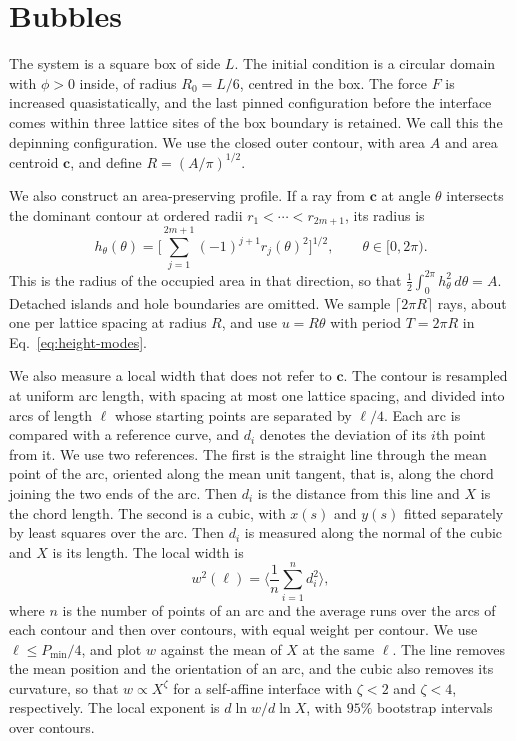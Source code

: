 \section{Bubbles}
\label{sec:bubbles}

The system is a square box of side $L$. The initial condition is a
circular domain with $\phi>0$ inside, of radius $R_0=L/6$, centred in
the box. The force $F$ is increased quasistatically, and the last pinned
configuration before the interface comes within three lattice sites of
the box boundary is retained. We call this the depinning configuration.
We use the closed outer contour, with area $A$ and area centroid
$\boldsymbol c$, and define $R=(A/\pi)^{1/2}$.

We also construct an area-preserving profile.
If a ray from $\boldsymbol c$ at angle $\theta$ intersects the dominant
contour at ordered radii $r_1<\cdots<r_{2m+1}$, its radius is
\begin{equation}
 h_\theta(\theta)=\Big[\sum_{j=1}^{2m+1}(-1)^{j+1}r_j(\theta)^2\Big]^{1/2},
 \qquad \theta\in[0,2\pi).
 \label{eq:area-radius}
\end{equation}
This is the radius of the occupied area in that direction, so that
$\frac12\int_0^{2\pi}h_\theta^2\,d\theta=A$.
Detached islands and hole boundaries are omitted.
We sample $\lceil2\pi R\rceil$ rays, about one per lattice spacing at
radius $R$, and use $u=R\theta$ with period $T=2\pi R$ in
Eq.~\eqref{eq:height-modes}.

We also measure a local width that does not refer to $\boldsymbol c$.
The contour is resampled at uniform arc length, with spacing at most one
lattice spacing, and divided into arcs of length $\ell$ whose starting
points are separated by $\ell/4$.
Each arc is compared with a reference curve, and $d_i$ denotes the
deviation of its $i$th point from it.
We use two references.
The first is the straight line through the mean point of the arc,
oriented along the mean unit tangent, that is, along the chord joining
the two ends of the arc. Then $d_i$ is the distance from this line and
$X$ is the chord length.
The second is a cubic, with $x(s)$ and $y(s)$ fitted separately by least
squares over the arc. Then $d_i$ is measured along the normal of the
cubic and $X$ is its length.
The local width is
\begin{equation}
 w^2(\ell)=\Big\langle\frac1n\sum_{i=1}^{n}d_i^2\Big\rangle,
 \label{eq:arc-width}
\end{equation}
where $n$ is the number of points of an arc and the average runs over
the arcs of each contour and then over contours, with equal weight per
contour. We use $\ell\leq P_{\min}/4$, and plot $w$ against the mean of
$X$ at the same $\ell$.
The line removes the mean position and the orientation of an arc, and
the cubic also removes its curvature, so that $w\propto X^\zeta$ for a
self-affine interface with $\zeta<2$ and $\zeta<4$, respectively.
The local exponent is $d\ln w/d\ln X$, with $95\%$ bootstrap intervals
over contours.

